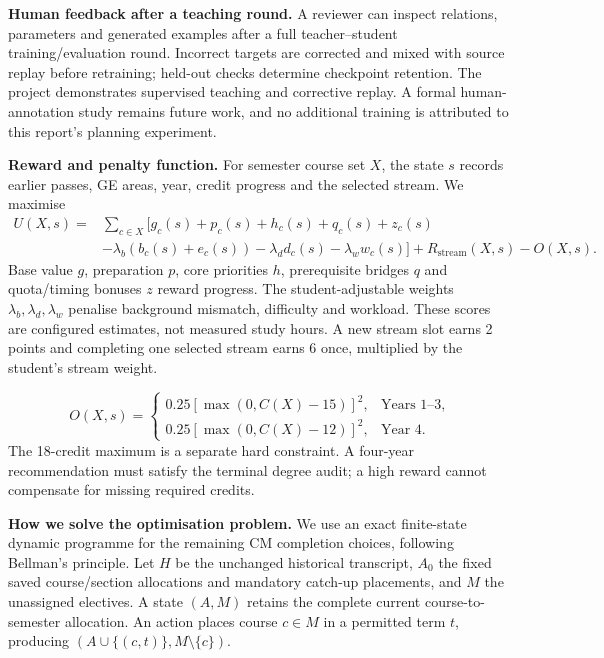 \documentclass{article}
\begin{document}
\textbf{Human feedback after a teaching round.} A reviewer can inspect relations, parameters and generated examples after a full teacher--student training/evaluation round. Incorrect targets are corrected and mixed with source replay before retraining; held-out checks determine checkpoint retention. The project demonstrates supervised teaching and corrective replay. A formal human-annotation study remains future work, and no additional training is attributed to this report's planning experiment.

\textbf{Reward and penalty function.} For semester course set $X$, the state $s$ records earlier passes, GE areas, year, credit progress and the selected stream. We maximise
\begin{align}
U(X,s)={}&\sum_{c\in X}\bigl[g_c(s)+p_c(s)+h_c(s)+q_c(s)+z_c(s)\nonumber\\
&-\lambda_b(b_c(s)+e_c(s))-\lambda_d d_c(s)-\lambda_w w_c(s)\bigr]
+R_{\mathrm{stream}}(X,s)-O(X,s).\label{eq:utility}
\end{align}
Base value $g$, preparation $p$, core priorities $h$, prerequisite bridges $q$ and quota/timing bonuses $z$ reward progress. The student-adjustable weights $\lambda_b,\lambda_d,\lambda_w$ penalise background mismatch, difficulty and workload. These scores are configured estimates, not measured study hours. A new stream slot earns 2 points and completing one selected stream earns 6 once, multiplied by the student's stream weight.

\begin{equation}
O(X,s)=\begin{cases}
0.25[\max(0,C(X)-15)]^2,&\text{Years 1--3},\\
0.25[\max(0,C(X)-12)]^2,&\text{Year 4}.
\end{cases}\label{eq:overload}
\end{equation}
The 18-credit maximum is a separate hard constraint. A four-year recommendation must satisfy the terminal degree audit; a high reward cannot compensate for missing required credits.

\newpage
\textbf{How we solve the optimisation problem.} We use an exact finite-state dynamic programme for the remaining CM completion choices, following Bellman's principle\citep{dp}. Let $H$ be the unchanged historical transcript, $A_0$ the fixed saved course/section allocations and mandatory catch-up placements, and $M$ the unassigned electives. A state $(A,M)$ retains the complete current course-to-semester allocation. An action places course $c\in M$ in a permitted term $t$, producing $(A\cup\{(c,t)\},M\setminus\{c\})$.
\end{document}
